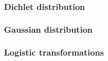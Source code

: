 \begin{frame}
  \frametitle{Dichlet distribution}
\end{frame}

\begin{frame}
  \frametitle{Gaussian distribution}
\end{frame}

\begin{frame}
  \frametitle{Logistic transformations}
\end{frame}
